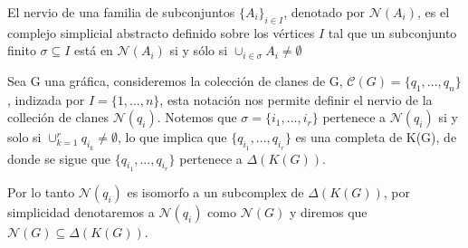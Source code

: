 \begin{Defi} 
El nervio de una familia de subconjuntos ${\{A_i\}}_{i\in I}$, denotado por $\mathcal{N}(A_i)$, es el complejo simplicial abstracto definido sobre los vértices $I$ tal que un subconjunto finito $\sigma \subseteq I$ está en $\mathcal{N}(A_i)$ si y sólo si ${\cup}_{i\in \sigma}A_i \neq \emptyset$
\end{Defi}
\begin{Ejem}
Sea G una gráfica, consideremos la colección de clanes de G, $\mathcal{C}(G) = \{q_1,...,q_n\}$, indizada por $I =\{1,...,n\}$, esta notación nos permite definir el nervio de la colleción de clanes $\mathcal{N}(q_i)$. Notemos que $\sigma = \{i_1,...,i_r\}$ pertenece a $\mathcal{N}(q_i)$ si y solo si $\cup_{k=1}^{r}q_{i_k}\neq\emptyset$, lo que implica que $\{q_{i_1},...,q_{i_r}\}$ es una completa de K(G), de donde se sigue que $\{q_{i_1},...,q_{i_r}\}$ pertenece a $\Delta(K(G))$.

Por lo tanto $\mathcal{N}(q_i)$ es isomorfo a un subcomplex de $\Delta(K(G))$, por simplicidad denotaremos a $\mathcal{N}(q_i)$ como $\mathcal{N}(G)$ y diremos que $\mathcal{N}(G)\subseteq \Delta(K(G))$.
\end{Ejem}